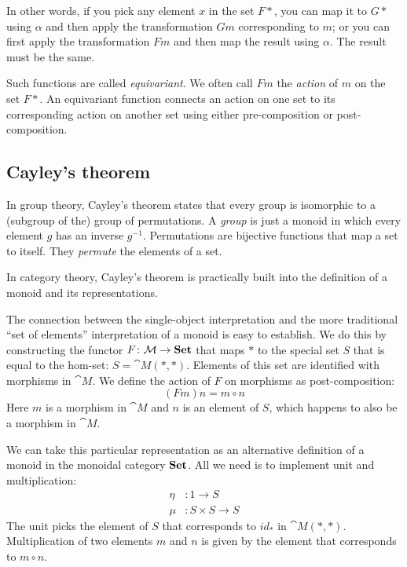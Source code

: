 \documentclass[DaoFP]{subfiles}
\begin{document}
In other words, if you pick any element $x$ in the set $F *$, you can map it to $G *$ using $\alpha$ and then apply the transformation $G m$ corresponding to $m$; or you can first apply the transformation $F m$ and then map the result using $\alpha$. The result must be the same.

Such functions are called \emph{equivariant}. We often call $F m$ the \emph{action} of $m$ on the set $F *$. An equivariant function connects an action on one set to its corresponding action on another set using either pre-composition or post-composition. 

\subsection{Cayley's theorem}

In group theory, Cayley's theorem states that every group is isomorphic to a (subgroup of the) group of permutations. A \emph{group} is just a monoid in which every element $g$ has an inverse $g^{-1}$. Permutations are bijective functions that map a set to itself. They \emph{permute} the elements of a set.

In category theory, Cayley's theorem is practically built into the definition of a monoid and its representations. 

The connection between the single-object interpretation and the more traditional ``set of elements'' interpretation of a monoid is easy to establish. We do this by constructing the functor $F \colon \mathcal{M} \to \mathbf{Set}$ that maps $*$ to the special set $S$ that is equal to the hom-set: $S = \cat M(*, *)$. Elements of this set are identified with morphisms in $\cat M$. We define the action of $F$ on morphisms as post-composition:
\[ (F m) n = m \circ n \]
Here $m$ is a morphism in $\cat M$ and $n$ is an element of $S$, which happens to also be a morphism in $\cat M$.

We can take this particular representation as an alternative definition of a monoid in the monoidal category $\mathbf{Set}$. All we need is to implement unit and multiplication:
\begin{align*}
\eta &\colon 1 \to S
\\
\mu &\colon S \times S \to S
\end{align*}
The unit picks the element of $S$ that corresponds to $id_*$ in $\cat M(*, *)$. Multiplication of two elements $m$ and $n$ is given by the element that corresponds to $m \circ n$. 
\end{document}
